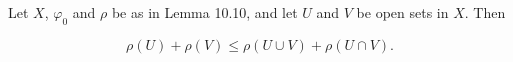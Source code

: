 Let $X$, $\varphi_0$ and $\rho$ be as in Lemma 10.10, and let $U$ and $V$ be open sets in $X$. Then

$$\rho(U) + \rho(V) \leq \rho(U \cup V) + \rho(U \cap V).$$
